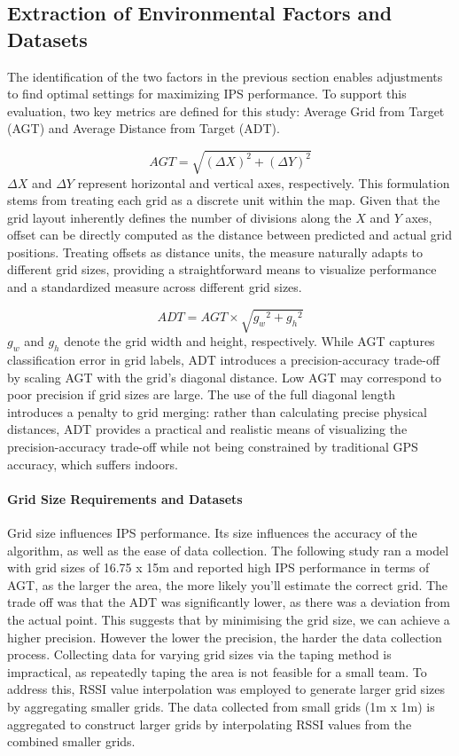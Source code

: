 \documentclass[runningheads]{llncs}
\begin{document}
\subsection{Extraction of Environmental Factors and Datasets}
The identification of the two factors in the previous section enables adjustments to find optimal settings for maximizing IPS performance. 
To support this evaluation, two key metrics are defined for this study: Average Grid from Target (AGT) and Average Distance from Target (ADT).

\begin{equation}
	AGT = \sqrt{(\Delta X)^2 + (\Delta Y)^2}
	\label{eq:agt}
\end{equation}
$\Delta X$ and $\Delta Y$ represent horizontal and vertical axes, respectively. This formulation stems from treating each grid as a discrete unit within the map. Given that the grid layout inherently defines the number of divisions along the $X$ and $Y$ axes, offset can be directly computed as the distance between predicted and actual grid positions. Treating offsets as distance units, the measure naturally adapts to different grid sizes, providing a straightforward means to visualize performance and a standardized measure across different grid sizes.

\begin{equation}
	ADT = AGT \times \sqrt{{g_w}^2 + {g_h}^2}
	\label{eq:adt}
\end{equation}
$g_w$ and $g_h$ denote the grid width and height, respectively. While AGT captures classification error in grid labels, ADT introduces a precision-accuracy trade-off by scaling AGT with the grid’s diagonal distance. Low AGT may correspond to poor precision if grid sizes are large. The use of the full diagonal length introduces a penalty to grid merging: rather than calculating precise physical distances, ADT provides a practical and realistic means of visualizing the precision-accuracy trade-off while not being constrained by traditional GPS accuracy, which suffers indoors.

\paragraph{Grid Size Requirements and Datasets} Grid size influences IPS performance. Its size influences the accuracy of the algorithm, as well as the ease of data collection. The following study \cite{LRE1} ran a model with grid sizes of 16.75 x 15m and reported high IPS performance in terms of AGT, as the larger the area, the more likely you’ll estimate the correct grid. The trade off was that the ADT was significantly lower, as there was a deviation from the actual point. This suggests that by minimising the grid size, we can achieve a higher precision. However the lower the precision, the harder the data collection process. 
Collecting data for varying grid sizes via the taping method is impractical, as repeatedly taping the area is not feasible for a small team. To address this, RSSI value interpolation was employed to generate larger grid sizes by aggregating smaller grids. The data collected from small grids (1m x 1m) is aggregated to construct larger grids by interpolating RSSI values from the combined smaller grids.
\end{document}
